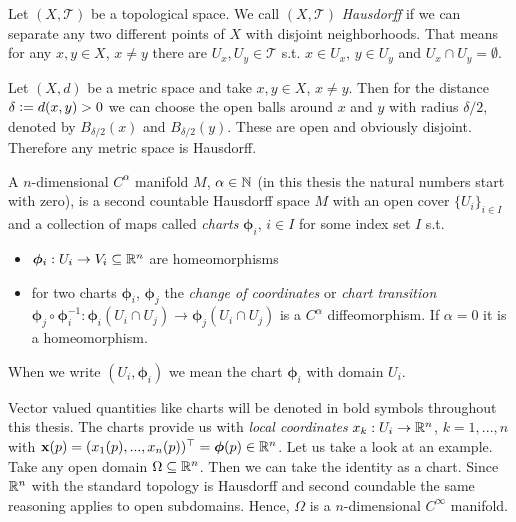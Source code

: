 \documentclass[../main.tex]{subfiles}
\begin{document}
\begin{definition}
    Let $(X, \mathcal{T})$ be a topological space. We call $(X, \mathcal{T})$
    \textit{Hausdorff} if we can separate any two different points of $X$
    with disjoint neighborhoods. That means for any $x,y \in X$, 
    $x\neq y$ there are $U_x, U_y \in \mathcal{T}$ s.t. 
    $x \in U_x$, $y \in U_y$ and $U_x \cap U_y = \emptyset$.
\end{definition}

\begin{example}
    Let $(X,d)$ be a metric space and take 
    $x,y \in X$, $x\neq y$. Then for the distance 
    $\delta \vcentcolon= d(x,y) > 0$ we can choose the open balls around $x$ and 
    $y$ with radius 
    $\delta/2$, denoted by $B_{\delta/2}(x)$ and $B_{\delta/2}(y)$. These are 
    open and obviously disjoint. Therefore any metric space is Hausdorff. 
\end{example}

\begin{definition}[Manifold]
    A $n$-dimensional $C^\alpha$ manifold $M$, $\alpha \in \mathbb{N}$ (in this thesis 
    the natural numbers start with zero), 
    is a second countable Hausdorff 
    space $M$ with an open cover $\{ U_i \} _{i\in I}$
    and a collection of maps called \textit{charts} $\boldsymbol{\phi}_i$, $i\in I$ for 
    some index set $I$ s.t.
    \begin{itemize}
        \item $\boldsymbol{\phi}_i: U_i \rightarrow V_i \subseteq \mathbb{R}^{n}$
            are homeomorphisms
        \item for two charts $\boldsymbol{\phi}_i$, $\boldsymbol{\phi}_j$ the 
            \textit{change of coordinates} or 
            \textit{chart transition} $\boldsymbol{\phi}_j \circ \boldsymbol{\phi}_i^{-1}: 
            \boldsymbol{\phi}_i(U_i \cap U_j) \rightarrow \boldsymbol{\phi}_j(U_i \cap U_j)$ 
            is a $C^\alpha$ diffeomorphism. If $\alpha=0$ it is a homeomorphism.
    \end{itemize}
    When we write $(U_i, \bm{\phi}_i)$ we mean the chart $\bm{\phi}_i$ with domain $U_i$.
\end{definition}
Vector valued quantities like charts will be denoted in bold symbols throughout this thesis.
The charts provide us with \textit{local coordinates} $x_k: U_i \rightarrow \mathbb{R}^n$,
$k = 1, ..., n$ with $\mathbf{x}(p) = (x_1(p),...,x_n(p))^\top = \boldsymbol{\phi}(p) \in \mathbb{R}^n$.
Let us take a look at an example. Take any open domain 
$\Omega \subseteq \mathbb{R}^n$. Then we can take the identity as a chart.
Since $\mathbb{R}^n$ with the standard topology is Hausdorff and second coundable
the same reasoning applies to open subdomains. Hence, $\Omega$ is a 
$n$-dimensional $C^\infty$ manifold. 
\end{document}
